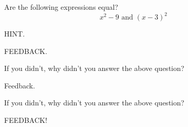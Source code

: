 \documentclass{ximera}
\begin{document}
\begin{problem} 
\begin{problem}
    Are the following expressions equal?
    $$x^2 - 9 \text{ and } (x-3)^2$$
    
    \begin{hint}
    HINT.
    \end{hint}
    
  \begin{multipleChoice}
      
        \begin{feedback}[attempt]
        FEEDBACK.
        \end{feedback}
        
  \end{multipleChoice}

\end{problem}

\begin{question}
  
    If you didn't, why didn't you answer the above question?
  
  \begin{multipleChoice}
      
      \begin{feedback}[attempt]
      Feedback.
      \end{feedback}
      
  \end{multipleChoice}
  
\end{question}

\begin{question}

    If you didn't, why didn't you answer the above question?

    \begin{multipleChoice}
      
          \begin{feedback}[attempt]
          FEEDBACK!
          \end{feedback}
          
  \end{multipleChoice}
\end{question}
\end{problem}
\end{document}
